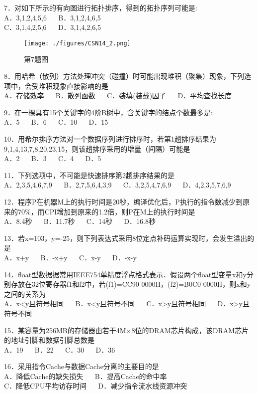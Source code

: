 7．对如下所示的有向图进行拓扑排序，得到的拓扑序列可能是: \\
A．3,1,2,4,5,6 $\quad$ B．3,1,2,4,6,5 \\
C．3,1,4,2,5,6 $\quad$ D．3,1,4,2,6,5
\begin{figure}[ht]
\centering
\texttt{[image: ./figures/CSN14\_2.png]}
\caption{第7题图} \label{CSN14_fig2}
\end{figure}

8．用哈希（散列）方法处理冲突（碰撞）时可能出现堆积（聚集）现象，下列选项中，会受堆积现象直接影响的是 \\
A．存储效率 $\quad$ B．散列函数 $\quad$ C．装填(装载)因子 $\quad$ D．平均查找长度

9．在一棵具有15个关键字的4阶B树中，含关键字的结点个数最多是: \\
A．5 $\quad$ B．6 $\quad$ C．10 $\quad$ D．15

10．用希尔排序方法对一个数据序列进行排序时，若第1趟排序结果为9,1,4,13,7,8,20,23,15，则该趟排序采用的增量（间隔）可能是 \\
A．2 $\quad$ B．3 $\quad$ C．4 $\quad$ D．5

11．下列选项中，不可能是快速排序第2趟排序结果的是 \\
A．2,3,5,4,6,7,9 $\quad$ B．2,7,5,6,4,3,9 $\quad$ C．3,2,5,4,7,6,9 $\quad$ D．4,2,3,5,7,6,9

12．程序P在机器M上的执行时间是20秒，编译优化后，P执行的指令数减少到原来的70\%，而CPI增加到原来的1.2倍，则P在M上的执行时间是 \\
A．8.4秒 $\quad$ B．11.7秒 $\quad$ C．14秒 $\quad$ D．16.8秒

13．若x=103，y=-25，则下列表达式采用8位定点补码运算实现时，会发生溢出的是 \\
A．x+y $\quad$ B．-x+y $\quad$ C．x-y $\quad$ D．-x-y

14．float型数据据常用IEEE754单精度浮点格式表示．假设两个float型变量x和y分别存放在32位寄存器f1和f2中，若(f1)=CC90 0000H，(f2)=B0C0 0000H，则x和y之间的关系为 \\
A．x<y且符号相同 $\quad$ B．x<y且符号不同 $\quad$ C．x>y且符号相同 $\quad$ D．x>y且符号不同

15．某容量为256MB的存储器由若干4M×8位的DRAM芯片构成，该DRAM芯片的地址引脚和数据引脚总数是 \\
A．19 $\quad$ B．22 $\quad$ C．30 $\quad$ D．36

16．采用指令Cache与数据Cache分离的主要目的是 \\
A．降低Cache的缺失损失 $\quad$ B．提高Cache的命中率 \\
C．降低CPU平均访存时间 $\quad$ D．减少指令流水线资源冲突

